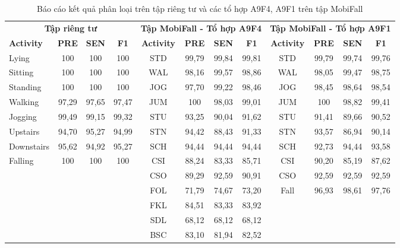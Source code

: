 \begin{table}[t]
    \centering
    \caption{Báo cáo kết quả phân loại trên tập riêng tư và các tổ hợp A9F4, A9F1 trên tập MobiFall}
    \label{classification_report}
    \begin{tabular}{lccc||cccc||cccc}\hline\hline
        \multicolumn{4}{c||}{\textbf{Tập riêng tư}} & \multicolumn{4}{c||}{\textbf{Tập MobiFall - Tổ hợp A9F4}} & \multicolumn{4}{c}{\textbf{Tập MobiFall - Tổ hợp A9F1}}\\
        \textbf{Activity} & \textbf{PRE} & \textbf{SEN} & \textbf{F1} & \textbf{Activity} & \textbf{PRE} & \textbf{SEN} & \textbf{F1} & \textbf{Activity} & \textbf{PRE} & \textbf{SEN} & \textbf{F1}\\\hline
        Lying & 100 & 100 & 100 & STD & 99,79 & 99,84 & 99,81 & STD & 99,79 & 99,74 & 99,76\\
        
        Sitting & 100 & 100 & 100 & WAL & 98,16 & 99,57 & 98,86 & WAL & 98,05 & 99,47 & 98,75\\
        
        Standing & 100 & 100 & 100 & JOG & 97,70 & 99,22 & 98,46 & JOG & 98,45 & 98,64 & 98,54\\
        
        Walking & 97,29 & 97,65 & 97,47 & JUM & 100 & 98,03 & 99,01 & JUM & 100 & 98,82 & 99,41\\
        
        Jogging & 99,49 & 99,15 & 99,32 & STU & 93,25 & 90,04 & 91,62 & STU & 91,41 & 89,66 & 90,52\\
        
        Upstairs & 94,70 & 95,27 & 94,99 & STN & 94,42 & 88,43 & 91,33 & STN & 93,57 & 86,94 & 90,14\\
        
        Downstairs & 95,62 & 94,92 & 95,27 & SCH & 94,44 & 94,44 & 94,44 & SCH & 92,73 & 94,44 & 93,58\\
        
        Falling & 100 & 100 & 100 & CSI & 88,24 & 83,33 & 85,71 & CSI & 90,20 & 85,19 & 87,62\\
        
         &  &  &  & CSO & 89,29 & 92,59 & 90,91 & CSO & 92,59 & 92,59 & 92,59\\
         
         &  &  &  & FOL & 71,79 & 74,67 & 73,20 & Fall & 96,93 & 98,61 & 97,76\\
         
         &  &  &  & FKL & 84,51 & 83,33 & 83,92 &  &  &  & \\
         &  &  &  & SDL & 68,12 & 68,12 & 68,12 &  &  &  & \\
         &  &  &  & BSC & 83,10 & 81,94 & 82,52 &  &  &  & \\\hline\hline
    \end{tabular}
\end{table}

